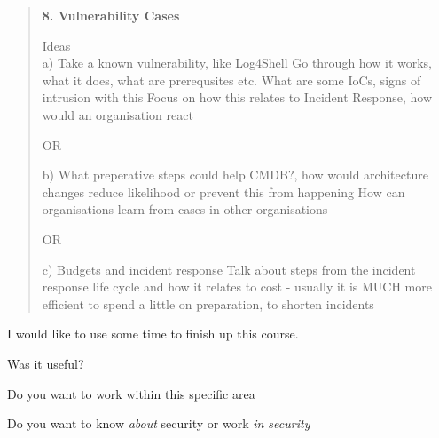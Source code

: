 \documentclass[Screen16to9,17pt]{foils}
\begin{document}
\begin{quote}
{\bf 8. Vulnerability Cases}

Ideas\\
a) Take a known vulnerability, like Log4Shell
Go through how it works, what it does, what are prerequsites etc.
What are some IoCs, signs of intrusion with this
Focus on how this relates to Incident Response, how would an organisation react

OR

b) What preperative steps could help CMDB?, how would architecture changes reduce likelihood or prevent this from happening
How can organisations learn from cases in other organisations

OR

c) Budgets and incident response
Talk about steps from the incident response life cycle and how it relates to cost
- usually it is MUCH more efficient to spend a little on preparation, to shorten incidents
\end{quote}




I would like to use some time to finish up this course.

\begin{list2}
\item Was it useful?
\item Do you want to work within this specific area
\item Do you want to know \emph{about} security or work \emph{in security}
\end{list2}
\end{document}
